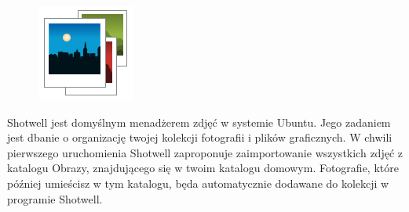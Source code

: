 \begin{figure}
	\vspace{-10pt}
	\includegraphics[width=\linewidth]{images/ikony_shotwell.png}
\end{figure}

Shotwell jest domyślnym menadżerem zdjęć w systemie Ubuntu. Jego zadaniem jest dbanie o organizację twojej kolekcji fotografii i plików graficznych. W chwili pierwszego uruchomienia Shotwell zaproponuje zaimportowanie wszystkich zdjęć z katalogu Obrazy, znajdującego się w twoim katalogu domowym. Fotografie, które później umieścisz w tym katalogu, będa automatycznie dodawane do kolekcji w programie Shotwell.

